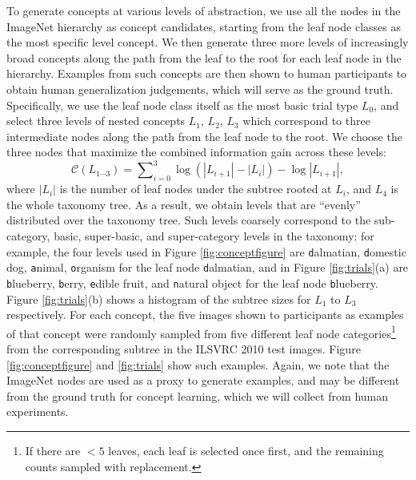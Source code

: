 To generate concepts at various levels of abstraction, we use all the nodes in the ImageNet hierarchy as concept candidates, starting from the leaf node classes as the most specific level concept. We then generate three more levels of increasingly broad concepts along the path from the leaf to the root for each leaf node in the hierarchy. Examples from such concepts are then shown to human participants to obtain human generalization judgements, which will serve as the ground truth. Specifically, we use the leaf node class itself as the most basic trial type $L_0$, and select three levels of nested concepts $L_1$, $L_2$, $L_3$ which correspond to three intermediate nodes along the path from the leaf node to the root. We choose the three nodes that maximize the combined information gain across these levels:
\begin{equation}
    \mathcal{C}(L_{1\cdots 3}) = \sum\nolimits_{i=0}^{3} \log(|L_{i+1}| - |L_{i}|) - \log|L_{i+1}|,
\end{equation}
where $|L_i|$ is the number of leaf nodes under the subtree rooted at $L_i$, and $L_4$ is the whole taxonomy tree. As a result, we obtain levels that are ``evenly'' distributed over the taxonomy tree. Such levels coarsely correspond to the sub-category, basic, super-basic, and super-category levels in the taxonomy: for example, the four levels used in Figure \ref{fig:conceptfigure} are {\texttt dalmatian}, {\texttt domestic dog}, {\texttt animal}, {\texttt organism} for the leaf node {\texttt dalmatian}, and in Figure \ref{fig:trials}(a) are {\texttt blueberry}, {\texttt berry}, {\texttt edible fruit}, and {\texttt natural object} for the leaf node {\texttt blueberry}. Figure \ref{fig:trials}(b) shows a histogram of the subtree sizes for $L_1$ to $L_3$ respectively.
For each concept, the five images shown to participants as examples of that concept were randomly sampled from five different leaf node categories\footnote{If there are $<5$ leaves, each leaf is selected once first, and the remaining counts sampled with replacement.} from the corresponding subtree in the ILSVRC 2010 test images. Figure \ref{fig:conceptfigure} and \ref{fig:trials} show such examples. Again, we note that the ImageNet nodes are used as a proxy to generate examples, and may be different from the ground truth for concept learning, which we will collect from human experiments.

